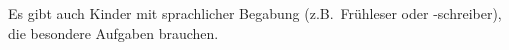 Es gibt auch Kinder mit sprachlicher Begabung (z.B.\ Frühleser oder -schreiber), die besondere Aufgaben brauchen.